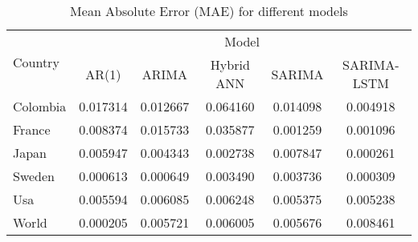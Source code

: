 \documentclass[hidelinks,11pts]{article}
\DeclareMathOperator{\1}{\mathbbm{1}}
\begin{document}
\begin{table}[htbp]
  \centering
  \caption{Mean Absolute Error (MAE) for different models}
  \label{tab:mae}
  \begin{tabular}{lccccc}
    \toprule
    \multirow{2}{*}{Country} & \multicolumn{5}{c}{Model} \\
    \cmidrule(lr){2-6}
    & AR(1) & ARIMA & Hybrid ANN & SARIMA & SARIMA-LSTM \\
    \midrule
    Colombia & 0.017314 & 0.012667 & 0.064160 & 0.014098 & 0.004918 \\
    France & 0.008374 & 0.015733 & 0.035877 & 0.001259 & 0.001096 \\
    Japan & 0.005947 & 0.004343 & 0.002738 & 0.007847 & 0.000261 \\
    Sweden & 0.000613 & 0.000649 & 0.003490 & 0.003736 & 0.000309 \\
    Usa & 0.005594 & 0.006085 & 0.006248 & 0.005375 & 0.005238 \\
    World & 0.000205 & 0.005721 & 0.006005 & 0.005676 & 0.008461 \\
    \bottomrule
  \end{tabular}
\end{table}
\end{document}

